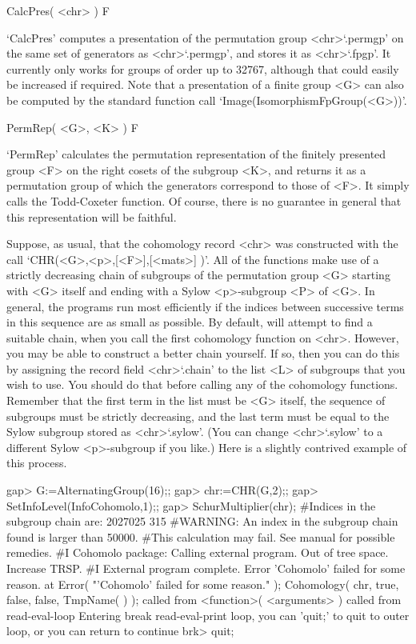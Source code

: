 
\>CalcPres( <chr> ) F

`CalcPres'  computes a presentation of the permutation group <chr>`.permgp'
on the same set of generators as <chr>`.permgp', and stores it as <chr>`.fpgp'.
It currently only works for groups of order up to 32767, although that
could easily be increased if required. Note that a presentation of a
finite group <G> can also be computed by the standard {\GAP} function
call `Image(IsomorphismFpGroup(<G>))'.


\>PermRep( <G>, <K> ) F

`PermRep' calculates the permutation representation of the finitely
presented group <F> on the right cosets of the subgroup <K>, and returns
it as a permutation group of which the generators correspond to those
of <F>. It simply calls the {\GAP} Todd-Coxeter function. Of course,
there is no guarantee in general that this representation will be
faithful.


Suppose, as usual, that the cohomology record <chr> was constructed
with the call `CHR(<G>,<p>,[<F>],[<mats>] )'.
All of the functions make use of a strictly decreasing chain of subgroups
of the permutation group <G> starting with <G> itself and ending with a
Sylow <p>-subgroup <P> of <G>. In general, the programs run most efficiently
if the indices between successive terms in this sequence are as small as
possible. By default, {\GAP} will attempt to find a suitable chain, when
you call the first cohomology function on <chr>. However, you may be able
to construct a better chain yourself. If so, then you can do this
by assigning the record field <chr>`.chain' to the list <L> of subgroups
that you wish to use. You should do that before calling any of the
cohomology functions. Remember that the first term in the list must be
<G> itself, the sequence of subgroups must be strictly decreasing,
and the last term must be equal to the Sylow subgroup stored as
<chr>`.sylow'. (You can change <chr>`.sylow' to a different Sylow
<p>-subgroup if you like.) Here is a slightly contrived example of this
process.

\beginexample
gap> G:=AlternatingGroup(16);;
gap> chr:=CHR(G,2);;
gap> SetInfoLevel(InfoCohomolo,1);;
gap> SchurMultiplier(chr);
#Indices in the subgroup chain are:  2027025 315 
#WARNING: An index in the subgroup chain found is larger than 50000.
#This calculation may fail. See manual for possible remedies.
#I   Cohomolo package: Calling external program.
Out of tree space. Increase TRSP.
#I   External program complete.
Error 'Cohomolo' failed for some reason.
 at
Error( "'Cohomolo' failed for some reason.\n" );
Cohomology( chr, true, false, false, TmpName(  ) ); called from
<function>( <arguments> ) called from read-eval-loop
Entering break read-eval-print loop, you can 'quit;' to quit to outer loop,
or you can return to continue
brk> quit;


